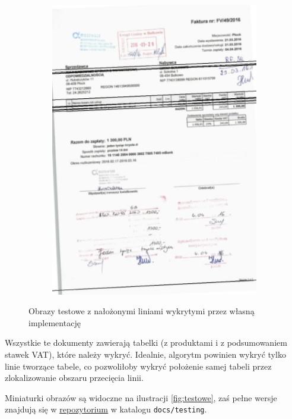 \documentclass[10pt]{article} %
\begin{document}
\begin{figure}
\begin{subfigure}{\linewidth}
  \includegraphics[width=.33\linewidth]{own/ALFA-gauss.jpg}\hfill
  \end{subfigure}
  \caption{Obrazy testowe z nałożonymi liniami wykrytymi przez własną implementację} \label{fig:java}
\end{figure}


Wszystkie te dokumenty zawierają tabelki (z produktami i z podsumowaniem stawek VAT), które należy wykryć. Idealnie, algorytm powinien wykryć tylko linie tworzące tabele, co pozwoliłoby wykryć położenie samej tabeli przez zlokalizowanie obszaru przecięcia linii.

Miniaturki obrazów są widoczne na ilustracji \ref{fig:testowe}, zaś pełne wersje znajdują się w \href{https://github.com/ciekawylogin/hough}{repozytorium} w katalogu \texttt{docs/testing}.
\end{document}
